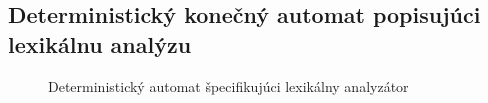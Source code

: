 \documentclass[a4paper, 11pt]{article}
\begin{document}
    \subsection{Deterministický konečný automat popisujúci lexikálnu analýzu}
    \begin{figure}[h]
		\centering
		\caption{Deterministický automat špecifikujúci lexikálny analyzátor}
	\end{figure}
	
	\pagebreak
	
\end{document}
